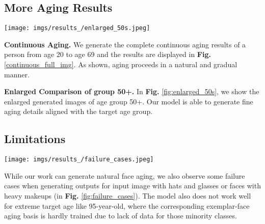 \documentclass[final]{cvpr}
\begin{document}
\subsection{More Aging Results}
\begin{figure*}[h!]
    \centering
    \vspace{-0.8cm}
    \texttt{[image: imgs/results\_/enlarged\_50s.jpeg]}
    \caption{Enlarged examples of generated age 50+. Our model demonstrate better details in aging effects such as wrinkles and beard change.}
    \label{fig:enlarged_50s}
\end{figure*}
\textbf{Continuous Aging.} We generate the complete continuous aging results of a person from age 20 to age 69 and the results are displayed in \textbf{Fig.} \ref{continuous_full_img}. As shown, aging proceeds in a natural and gradual manner.

\textbf{Enlarged Comparison of group 50+.} In \textbf{Fig.} \ref{fig:enlarged_50s}, we show the enlarged generated images of age group 50+. Our model is able to generate fine aging details aligned with the target age group.


\subsection{Limitations}
\begin{figure*}[h]
    \centering
    \vspace{-0.2cm}
    \texttt{[image: imgs/results\_/failure\_cases.jpeg]}
    \caption{Failure cases: heavy makeup with hat, glasses with bad lighting. Our model could not best capture the personalized information such as skin texture in these cases. }
    \vspace{-0.3cm}
    \label{fig:failure_cases}
\end{figure*}


While our work can generate natural face aging, we also observe some failure cases when generating outputs for input image with hats and glasses or faces with heavy makeups (in \textbf{Fig.} \ref{fig:failure_cases}). The model also does not work well for extreme target age like 95-year-old, where the corresponding exemplar-face aging basis is hardly trained due to lack of data for those minority classes.
\end{document}
